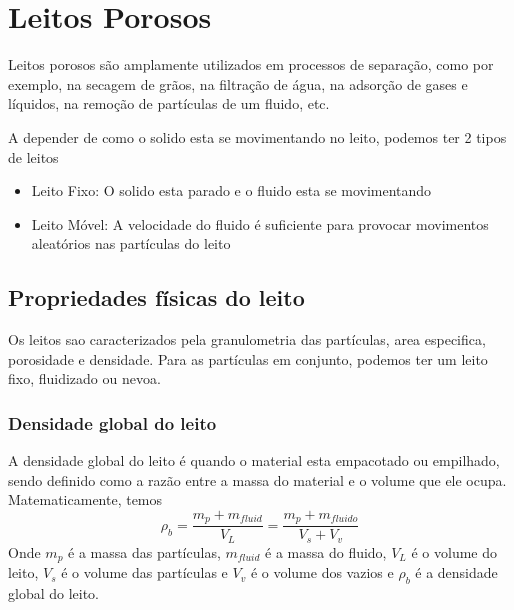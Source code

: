 \section{Leitos Porosos}
Leitos porosos são amplamente utilizados em processos de separação, como por exemplo, na secagem de
grãos, na filtração de água, na adsorção de gases e líquidos, na remoção de partículas de um fluido,
etc. \par

A depender de como o solido esta se movimentando no leito, podemos ter 2 tipos de leitos
\begin{itemize}
    \item Leito Fixo: O solido esta parado e o fluido esta se movimentando
    \item Leito Móvel: A velocidade do fluido é suficiente para provocar movimentos aleatórios nas
    partículas do leito
\end{itemize}
\subsection{Propriedades físicas do leito}
Os leitos sao caracterizados pela granulometria das partículas, area especifica, porosidade e
densidade. Para as partículas em conjunto, podemos ter um leito fixo, fluidizado ou nevoa. \par
\subsubsection{Densidade global do leito}
A densidade global do leito é quando o material esta empacotado ou empilhado, sendo definido como a
razão entre a massa do material e o volume que ele ocupa. Matematicamente, temos
\begin{equation}
    \rho _{b} = \frac{m_{p} + m_{fluid} }{V_{L} } = \frac{m_{p} + m_{fluido}}{V_{s} + V_{v} }
\end{equation}
Onde \(m_{p}\) é a massa das partículas, \(m_{fluid}\) é a massa do fluido, \(V_{L}\) é o volume do
leito, \(V_{s}\) é o volume das partículas e \(V_{v}\) é o volume dos vazios e \(\rho _{b} \) é a  
densidade global do leito. \par 
